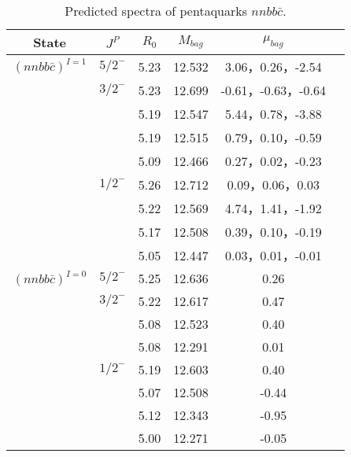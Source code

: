 \documentclass[prd,twocolumn,floatfix,nofootinbib]{revtex4}
\begin{document}
\begin{table*}[!htbp]
    \caption{Predicted spectra of pentaquarks $nnbb\bar{c}$.}
    \begin{tabular}{cccccc}
        \hline\hline
        {\rm State} &$J^{P}$ &$R_{0}$ &$M_{bag}$ &$\mu_{bag}$  \\ \hline
        ${(nnbb\bar{c})}^{I=1}$
            &${5/2}^{-}$     &5.23   &12.532 &3.06，0.26，-2.54  \\                
            &${3/2}^{-}$     &5.23   &12.699 &-0.61，-0.63，-0.64 \\
                         &$ $     &5.19   &12.547 &5.44，0.78，-3.88  \\
                         &$ $     &5.19   &12.515 &0.79，0.10，-0.59  \\
                         &$ $     &5.09   &12.466 &0.27，0.02，-0.23\\
            &${1/2}^{-}$     &5.26   &12.712 &0.09，0.06，0.03  \\
                         &$ $     &5.22   &12.569 &4.74，1.41，-1.92  \\
                         &$ $     &5.17   &12.508 &0.39，0.10，-0.19  \\
                         &$ $     &5.05   &12.447 &0.03，0.01，-0.01 \\
            ${(nnbb\bar{c})}^{I=0}$
            &${5/2}^{-}$     &5.25   &12.636 &0.26  \\                
            &${3/2}^{-}$     &5.22   &12.617 &0.47 \\
                         &$ $     &5.08   &12.523 &0.40  \\
                         &$ $     &5.08   &12.291 &0.01  \\
            &${1/2}^{-}$     &5.19   &12.603 &0.40  \\
                         &$ $     &5.07   &12.508 &-0.44  \\
                         &$ $     &5.12   &12.343 &-0.95  \\
                         &$ $     &5.00   &12.271 &-0.05 \\
       \hline\hline
    \end{tabular}
\end{table*}
\end{document}
